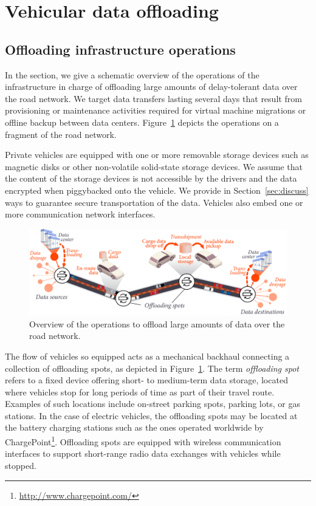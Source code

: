 \section{Vehicular data offloading}
\label{sec:operations}

\subsection{Offloading infrastructure operations}

In the section, we give a schematic overview of the operations of the infrastructure  in charge of offloading large amounts of delay-tolerant data over the road network. We target data transfers lasting several days that result from provisioning or maintenance activities required for virtual machine migrations or offline backup between data centers. Figure~\ref{fig:offloading-operations} depicts the operations on a fragment of the road network.  

Private vehicles are equipped with one or more removable storage devices such as magnetic disks or other non-volatile solid-state storage devices. We assume that the content of the storage devices is not accessible by the drivers and the data encrypted when piggybacked onto the vehicle. We provide in Section~\ref{sec:discuss} ways to guarantee secure transportation of the data. Vehicles also embed one or more communication network interfaces. 

\begin{figure}[h!]
	\centering
		\includegraphics[width=0.95\columnwidth]{figures/taxonomy.pdf}
	\caption{Overview of the operations to offload large amounts of data over the road network.}
	\label{fig:offloading-operations}
\end{figure}

The flow of vehicles so equipped acts as a mechanical backhaul connecting a collection of offloading spots, as depicted in Figure~\ref{fig:offloading-operations}.
The term \textit{offloading spot} refers to a fixed device offering short- to medium-term data storage, located where vehicles stop for long periods of time as part of their travel route. Examples of such locations include on-street parking spots, parking lots, or gas stations. In the case of electric vehicles, the offloading spots may be located at the battery charging stations such as the ones operated worldwide by ChargePoint\footnote{\url{http://www.chargepoint.com/}}. Offloading spots are equipped with wireless communication interfaces to support short-range radio data exchanges with vehicles while stopped. 

